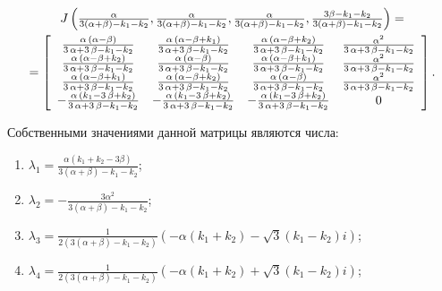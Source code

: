 \documentclass[12pt]{article}
\theoremstyle{rusdef}
\begin{document}
	\begin{gather}
	J\left( \tfrac{\alpha}{3(\alpha + \beta) - k_1 - k_2}, \tfrac{\alpha}{3(\alpha + \beta) - k_1 - k_2}, \tfrac{\alpha}{3(\alpha + \beta) - k_1 - k_2}, \tfrac{3\beta - k_1 - k_2}{3(\alpha + \beta) - k_1 - k_2} \right) = \notag \\
	= \left[
\begin{array}{cccc} \frac{\alpha\, \left(\alpha - \beta\right)}{3\, \alpha + 3\, \beta - k_{1} - k_{2}} & \frac{\alpha\, \left(\alpha - \beta + k_{1}\right)}{3\, \alpha + 3\, \beta - k_{1} - k_{2}} & \frac{\alpha\, \left(\alpha - \beta + k_{2}\right)}{3\, \alpha + 3\, \beta - k_{1} - k_{2}} & \frac{{\alpha}^2}{3\, \alpha + 3\, \beta - k_{1} - k_{2}}\\ \frac{\alpha\, \left(\alpha - \beta + k_{2}\right)}{3\, \alpha + 3\, \beta - k_{1} - k_{2}} & \frac{\alpha\, \left(\alpha - \beta\right)}{3\, \alpha + 3\, \beta - k_{1} - k_{2}} & \frac{\alpha\, \left(\alpha - \beta + k_{1}\right)}{3\, \alpha + 3\, \beta - k_{1} - k_{2}} & \frac{{\alpha}^2}{3\, \alpha + 3\, \beta - k_{1} - k_{2}}\\ \frac{\alpha\, \left(\alpha - \beta + k_{1}\right)}{3\, \alpha + 3\, \beta - k_{1} - k_{2}} & \frac{\alpha\, \left(\alpha - \beta + k_{2}\right)}{3\, \alpha + 3\, \beta - k_{1} - k_{2}} & \frac{\alpha\, \left(\alpha - \beta\right)}{3\, \alpha + 3\, \beta - k_{1} - k_{2}} & \frac{{\alpha}^2}{3\, \alpha + 3\, \beta - k_{1} - k_{2}}\\ -\frac{\alpha\, \left(k_{1} - 3\, \beta + k_{2}\right)}{3\, \alpha + 3\, \beta - k_{1} - k_{2}} & -\frac{\alpha\, \left(k_{1} - 3\, \beta + k_{2}\right)}{3\, \alpha + 3\, \beta - k_{1} - k_{2}} & -\frac{\alpha\, \left(k_{1} - 3\, \beta + k_{2}\right)}{3\, \alpha + 3\, \beta - k_{1} - k_{2}} & 0 \end{array}
	\right]. \notag
	\end{gather}

	Собственными значениями данной матрицы являются числа:
	\begin{enumerate}
		\item
		$\lambda_1 = \frac{\alpha(k_1 + k_2 - 3\beta)}{3(\alpha + \beta) - k_1 - k_2}$;
		\item
		$\lambda_2 = -\frac{3\alpha^2}{3(\alpha + \beta) - k_1 - k_2}$;
		\item
		$\lambda_3 = \frac{1}{2(3(\alpha + \beta) - k_1 - k_2)} \left( -\alpha(k_1 + k_2) - \sqrt{3} (k_1 - k_2)i \right)$;
		\item
		$\lambda_4 = \frac{1}{2(3(\alpha + \beta) - k_1 - k_2)} \left( -\alpha(k_1 + k_2) + \sqrt{3} (k_1 - k_2)i \right)$;
	\end{enumerate}
	
\end{document}
